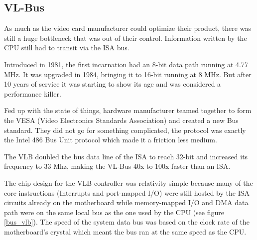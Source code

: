 \subsection{VL-Bus}
As much as the video card manufacturer could optimize their product, there was still a huge bottleneck that was out of their control. Information written by the CPU still had to transit via the ISA bus.\\
\par
 Introduced in 1981, the first incarnation had an 8-bit data path running at 4.77 MHz. It was upgraded in 1984, bringing it to 16-bit running at 8 MHz. But after 10 years of service it was starting to show its age and was considered a performance killer.\\
\par
{}
\par
Fed up with the state of things, hardware manufacturer teamed together to form the VESA (Video Electronics Standards Association) and created a new Bus standard. They did not go for something complicated, the protocol was exactly the Intel 486 Bus Unit protocol which made it a friction less medium.\\
\par 
The VLB doubled the bus data line of the ISA to reach 32-bit and increased its frequency to 33 Mhz, making the VL-Bus 40x to 100x faster than an ISA.\\
\par
The chip design for the VLB controller was relativity simple because many of the core instructions (Interrupts and port-mapped I/O) were still hosted by the ISA circuits already on the motherboard while memory-mapped I/O and DMA data path were on the same local bus as the one used by the CPU (see figure \ref{bus_vlb}). The speed of the system data bus was based on the clock rate of the motherboard's crystal which meant the bus ran at the same speed as the CPU.\\
\par
{}
\label{vlbarchitecture}

